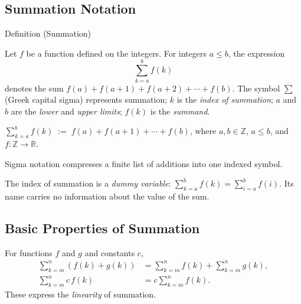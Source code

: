 
\subsection{Summation Notation}

\begin{definitionbox}{Definition (Summation)}
\begin{definition}[Summation]
\label{def:sigma-summation-notation}
Let \(f\) be a function defined on the integers.
For integers \(a \le b\), the expression
\[
\sum_{k=a}^{b} f(k)
\]
denotes the sum \(f(a) + f(a+1) + f(a+2) + \cdots + f(b)\).
The symbol \(\sum\) (Greek capital sigma) represents summation;
\(k\) is the \emph{index of summation}; \(a\) and \(b\) are the
\emph{lower} and \emph{upper limits}; \(f(k)\) is the \emph{summand}.
\end{definition}
\end{definitionbox}

\begin{remark*}
\(\displaystyle\sum_{k=a}^{b} f(k) \;:=\; f(a) + f(a+1) + \cdots + f(b)\),
where \(a,b \in \mathbb{Z}\), \(a \le b\), and \(f : \mathbb{Z}\to\mathbb{R}\).
\end{remark*}

\begin{remark*}[Interpretation]
Sigma notation compresses a finite list of additions into one indexed symbol.
\end{remark*}

\begin{remark*}[Exposition]
The index of summation is a \emph{dummy variable}:
\(\displaystyle\sum_{k=a}^{b} f(k) = \sum_{i=a}^{b} f(i)\).
Its name carries no information about the value of the sum.
\end{remark*}

\DefinitionalRoot

\subsection*{Basic Properties of Summation}

\begin{remark*}[Interpretation]
For functions \(f\) and \(g\) and constants \(c\),
\begin{align*}
\sum_{k=m}^{n} (f(k) + g(k))
&=
\sum_{k=m}^{n} f(k)
+
\sum_{k=m}^{n} g(k), \\[6pt]
\sum_{k=m}^{n} c\,f(k)
&=
c \sum_{k=m}^{n} f(k).
\end{align*}
These express the \emph{linearity} of summation.
\end{remark*}

